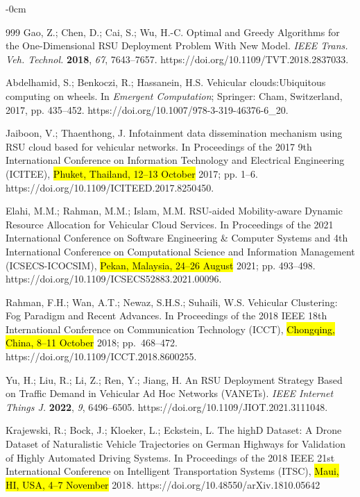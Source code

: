 \documentclass[electronics,aricle,accept,pdftex,moreauthors]{Definitions/mdpi}
\begin{document}
\begin{adjustwidth}{-\extralength}{0cm}
\begin{thebibliography}{999}
Gao, Z.; Chen, D.; Cai, S.; Wu, H.-C.  Optimal and Greedy Algorithms for the One-Dimensional RSU Deployment Problem With New Model.  \emph{IEEE Trans. Veh. Technol.} \textbf{2018}, \emph{67}, 7643--7657. https://doi.org/10.1109/TVT.2018.2837033.


Abdelhamid, S.; Benkoczi, R.; Hassanein, H.S.  Vehicular clouds:Ubiquitous computing on wheels. In \textit{Emergent Computation}; Springer: Cham, Switzerland,  2017, pp. 435--452. https://doi.org/10.1007/978-3-319-46376-6\_20.

Jaiboon, V.; Thaenthong, J. Infotainment data dissemination mechanism using RSU cloud based for vehicular networks. In Proceedings of the {2017 9th International Conference on Information Technology and Electrical Engineering (ICITEE)}, \hl{Phuket, Thailand, 12--13 October} 2017; pp. 1--6. https://doi.org/10.1109/ICITEED.2017.8250450.

Elahi, M.M.; Rahman, M.M.; Islam, M.M.  RSU-aided Mobility-aware Dynamic Resource Allocation for Vehicular Cloud Services. In Proceedings of the {2021 International Conference on Software Engineering \& Computer Systems and 4th International Conference on Computational Science and Information Management (ICSECS-ICOCSIM)}, \hl{Pekan, Malaysia, 24--26 August} 2021; pp. 493--498. https://doi.org/10.1109/ICSECS52883.2021.00096.

Rahman, F.H.; Wan, A.T.; Newaz, S.H.S.; Suhaili, W.S.  Vehicular Clustering: Fog Paradigm and Recent Advances. In Proceedings of the {2018 IEEE 18th International Conference on Communication Technology (ICCT)}, \hl{Chongqing, China, 8--11 October} 2018; pp.~468--472. https://doi.org/10.1109/ICCT.2018.8600255.


Yu, H.; Liu, R.; Li, Z.; Ren, Y.; Jiang, H. An RSU Deployment Strategy Based on Traffic Demand in Vehicular Ad Hoc Networks (VANETs).  \emph{IEEE Internet Things J.} \textbf{2022},  \emph{9}, 6496--6505. https://doi.org/10.1109/JIOT.2021.3111048.

Krajewski, R.; Bock, J.; Kloeker, L.; Eckstein, L. The highD Dataset: A Drone Dataset of Naturalistic Vehicle Trajectories on German Highways for Validation of Highly Automated Driving Systems. In Proceedings of the {2018 IEEE 21st International Conference on Intelligent Transportation Systems (ITSC)}, \hl{Maui, HI, USA, 4--7 November} 2018. https://doi.org/10.48550/arXiv.1810.05642


\end{thebibliography}
\end{adjustwidth}
\end{document}

